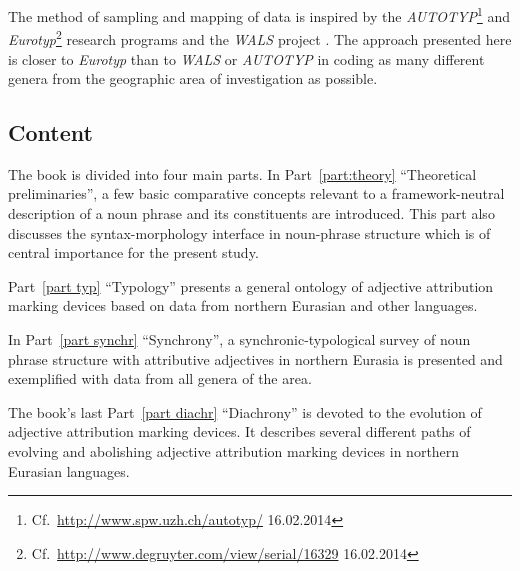 The method of sampling and mapping of data is inspired by the \emph{AUTOTYP}\footnote{Cf.~\url{http://www.spw.uzh.ch/autotyp/} 16.02.2014} and \emph{Eurotyp}\footnote{Cf.~\url{http://www.degruyter.com/view/serial/16329} 16.02.2014} research programs and the \emph{WALS} project \citep{walsOnline2013}. The approach presented here is closer to \emph{Eurotyp} than to \emph{WALS} or \emph{AUTOTYP} in coding as many different genera from the geographic area of investigation as possible.

\subsection*{Content}
The book is divided into four main parts. In Part~\ref{part:theory} “Theoretical preliminaries”, a few basic comparative concepts relevant to a framework-neutral description of a noun phrase and its constituents are introduced. This part also discusses the syntax-morphology interface in noun-phrase structure which is of central importance for the present study.

Part~\ref{part typ} “Typology” presents a general ontology of adjective attribution marking devices based on data from northern Eurasian and other languages.

In Part~\ref{part synchr} “Synchrony”, a synchronic-typological survey of noun phrase structure with attributive adjectives in northern Eurasia is presented and exemplified with data from all genera of the area.

The book's last Part~\ref{part diachr} “Diachrony” is devoted to the evolution of adjective attribution marking devices. It describes several different paths of evolving and abolishing adjective attribution marking devices in northern Eurasian languages.
